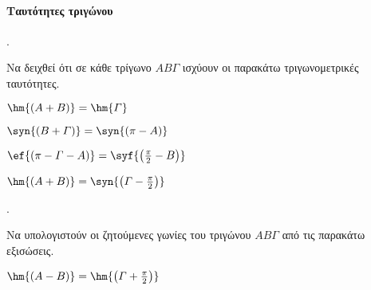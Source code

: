 \documentclass[11pt,a4paper,twocolumn]{article}
\newcounter{askhsh}
\newcommand{\askhsh}{{\large\theaskhsh.}\ \addtocounter{askhsh}{1}}
\begin{document}
\paragraph{Ταυτότητες τριγώνου}
\askhsh
Να δειχθεί ότι σε κάθε τρίγωνο $ AB\varGamma $ ισχύουν οι παρακάτω τριγωνομετρικές ταυτότητες.
\begin{alist}
\item $ \hm{(A+B)}=\hm{\varGamma} $
\item $ \syn{(B+\varGamma)}=\syn{(\pi-A)} $
\item $ \ef{(\pi-\varGamma-A)}=\syf{\left(\frac{\pi}{2}-B\right) } $
\item $ \hm{(A+B)}=\syn{\left(\varGamma-\frac{\pi}{2}\right) } $
\end{alist}
\askhsh
Να υπολογιστούν οι ζητούμενες γωνίες του τριγώνου $ AB\varGamma $ από τις παρακάτω εξισώσεις.
\begin{alist}
\item $ \hm{(A-B)}=\hm{\left(\varGamma+\frac{\pi}{2} \right) } $
\end{alist}
\end{document}
